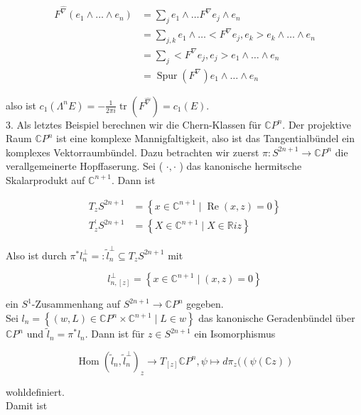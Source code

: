 \documentclass[10pt, letterpaper]{article}
\begin{document}
$$
\begin{aligned}
F^{\hat{\nabla}}\left(e_{1} \wedge \ldots \wedge e_{n}\right) & =\sum_{j} e_{1} \wedge \ldots F^{\nabla} e_{j} \wedge e_{n} \\
& =\sum_{j, k} e_{1} \wedge \ldots<F^{\nabla} e_{j}, e_{k}>e_{k} \wedge \ldots \wedge e_{n} \\
& =\sum_{j}<F^{\nabla} e_{j}, e_{j}>e_{1} \wedge \ldots \wedge e_{n} \\
& =\operatorname{Spur}\left(F^{\nabla}\right) e_{1} \wedge \ldots \wedge e_{n}
\end{aligned}
$$

also ist $c_{1}\left(\Lambda^{n} E\right)=-\frac{1}{2 \pi i} \operatorname{tr}\left(F^{\hat{\nabla}}\right)=c_{1}(E)$.\\
3. Als letztes Beispiel berechnen wir die Chern-Klassen für $\mathbb{C} P^{n}$. Der projektive Raum $\mathbb{C} P^{n}$ ist eine komplexe Mannigfaltigkeit, also ist das Tangentialbündel ein komplexes Vektorraumbündel. Dazu betrachten wir zuerst $\pi: S^{2 n+1} \rightarrow \mathbb{C} P^{n}$ die verallgemeinerte Hopffaserung. Sei ( $\cdot, \cdot$ ) das kanonische hermitsche Skalarprodukt auf $\mathbb{C}^{n+1}$. Dann ist

$$
\begin{aligned}
T_{z} S^{2 n+1} & =\left\{x \in \mathbb{C}^{n+1} \mid \operatorname{Re}(x, z)=0\right\} \\
T_{z}^{\prime} S^{2 n+1} & =\left\{X \in \mathbb{C}^{n+1} \mid X \in \mathbb{R} i z\right\}
\end{aligned}
$$

Also ist durch $\pi^{*} l_{n}^{\perp}=: \tilde{l}_{n}^{\perp} \subseteq T_{z} S^{2 n+1}$ mit

$$
l_{n,[z]}^{\perp}=\left\{x \in \mathbb{C}^{n+1} \mid(x, z)=0\right\}
$$

ein $S^{1}$-Zusammenhang auf $S^{2 n+1} \rightarrow \mathbb{C} P^{n}$ gegeben.\\
Sei $l_{n}=\left\{(w, L) \in \mathbb{C} P^{n} \times \mathbb{C}^{n+1} \mid L \in w\right\}$ das kanonische Geradenbündel über $\mathbb{C} P^{n}$ und $\tilde{l}_{n}=\pi^{*} l_{n}$. Dann ist für $z \in S^{2 n+1}$ ein Isomorphismus

$$
\operatorname{Hom}\left(\tilde{l}_{n}, \tilde{l}_{n}^{\perp}\right)_{z} \rightarrow T_{[z]} \mathbb{C} P^{n}, \psi \mapsto d \pi_{z}((\psi(\mathbb{C} z))
$$

wohldefiniert.\\
Damit ist
\end{document}

